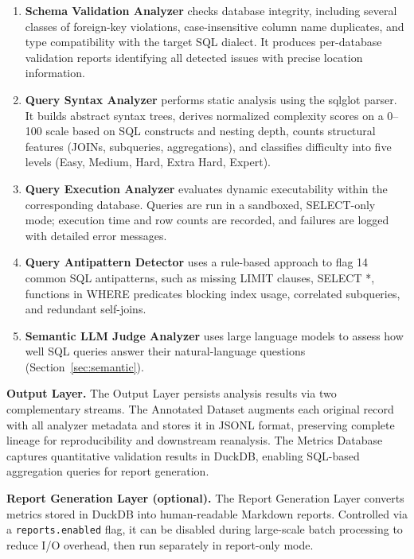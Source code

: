 \documentclass[]{einformatica}
\begin{document}
\begin{enumerate}
\item \textbf{Schema Validation Analyzer} checks database integrity, including several classes of foreign-key violations, case-insensitive column name duplicates, and type compatibility with the target SQL dialect. It produces per-database validation reports identifying all detected issues with precise location information.

\item \textbf{Query Syntax Analyzer} performs static analysis using the sqlglot parser. It builds abstract syntax trees, derives normalized complexity scores on a 0--100 scale based on SQL constructs and nesting depth, counts structural features (JOINs, subqueries, aggregations), and classifies difficulty into five levels (Easy, Medium, Hard, Extra Hard, Expert).

\item \textbf{Query Execution Analyzer} evaluates dynamic executability within the corresponding database. Queries are run in a sandboxed, SELECT-only mode; execution time and row counts are recorded, and failures are logged with detailed error messages.

\item \textbf{Query Antipattern Detector} uses a rule-based approach to flag 14 common SQL antipatterns, such as missing LIMIT clauses, SELECT *, functions in WHERE predicates blocking index usage, correlated subqueries, and redundant self-joins.

\item \textbf{Semantic LLM Judge Analyzer} uses large language models to assess how well SQL queries answer their natural-language questions (Section~\ref{sec:semantic}).
\end{enumerate}

\textbf{Output Layer.} The Output Layer persists analysis results via two complementary streams. The Annotated Dataset augments each original record with all analyzer metadata and stores it in JSONL format, preserving complete lineage for reproducibility and downstream reanalysis. The Metrics Database captures quantitative validation results in DuckDB, enabling SQL-based aggregation queries for report generation.

\textbf{Report Generation Layer (optional).} The Report Generation Layer converts metrics stored in DuckDB into human-readable Markdown reports. Controlled via a \texttt{reports.enabled} flag, it can be disabled during large-scale batch processing to reduce I/O overhead, then run separately in report-only mode.
\end{document}
